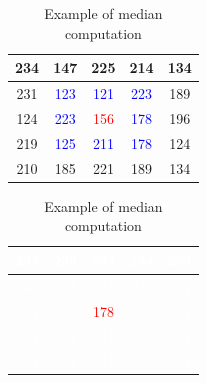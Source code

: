 \begin{table}[tb]
	\caption{Example of median computation} 
	\label{tab:median_filter}
	\begin{center}
		\begin{tabular}{|c|c|c|c|c|}
		\hline 
		234 & 147 & 225 & 214 & 134 \\ 
		\hline 
		231 & \textcolor{blue}{123} & \textcolor{blue}{121} & \textcolor{blue}{223} & 189 \\ 
		\hline 
		124 & \textcolor{blue}{223} & \textcolor{red}{156} & \textcolor{blue}{178} & 196 \\ 
		\hline 
		219 & \textcolor{blue}{125} & \textcolor{blue}{211} & \textcolor{blue}{178} & 124 \\ 
		\hline 
		210 & 185 & 221 & 189 & 134 \\ 
		\hline 
		\end{tabular}
	\end{center}

	\begin{center}
		\begin{tabular}{|c|c|c|c|c|}
		\hline 
		\textcolor{white}{234} & \textcolor{white}{234} & \textcolor{white}{234} & \textcolor{white}{234} & \textcolor{white}{234} \\ 
		\hline 
		\textcolor{white}{234} & \textcolor{white}{234} & \textcolor{white}{234} & \textcolor{white}{234} & \textcolor{white}{234} \\ 
		\hline 
		\textcolor{white}{234} & \textcolor{white}{223} & \textcolor{red}{178} & \textcolor{white}{178} & \textcolor{white}{234} \\ 
		\hline 
		\textcolor{white}{234} & \textcolor{white}{234} & \textcolor{white}{234} & \textcolor{white}{234} & \textcolor{white}{234} \\ 
		\hline 
		\textcolor{white}{234} & \textcolor{white}{234} & \textcolor{white}{234} & \textcolor{white}{234} & \textcolor{white}{234} \\ 
		\hline 
		\end{tabular}
	\end{center}
\end{table}

